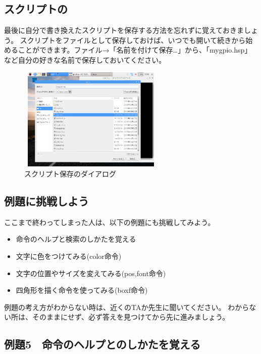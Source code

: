\clearpage
\subsection{スクリプトの}

最後に自分で書き換えたスクリプトを保存する方法を忘れずに覚えておきましょう。
スクリプトをファイルとして保存しておけば、いつでも開いて続きから始めることができます。ファイル→「名前を付けて保存…」から、「mygpio.hsp」など自分の好きな名前で保存しておいてください。

\begin{figure}[H]
    \begin{center}
        \includegraphics[keepaspectratio,width=6.976cm,height=4.944cm]{text02-img/text02-img028.png}
        \caption{スクリプト保存のダイアログ}
    \end{center}
\end{figure}

\subsection{例題に挑戦しよう}

ここまで終わってしまった人は、以下の例題にも挑戦してみよう。

\begin{itemize}
    \item 命令のヘルプと検索のしかたを覚える
    \item 文字に色をつけてみる(color命令)
    \item 文字の位置やサイズを変えてみる(pos,font命令)
    \item 四角形を描く命令を使ってみる(boxf命令)
\end{itemize}

例題の考え方がわからない時は、近くのTAか先生に聞いてください。
わからない所は、そのままにせず、必ず答えを見つけてから先に進みましょう。

\clearpage
\subsection{例題5　命令のヘルプとのしかたを覚える}

